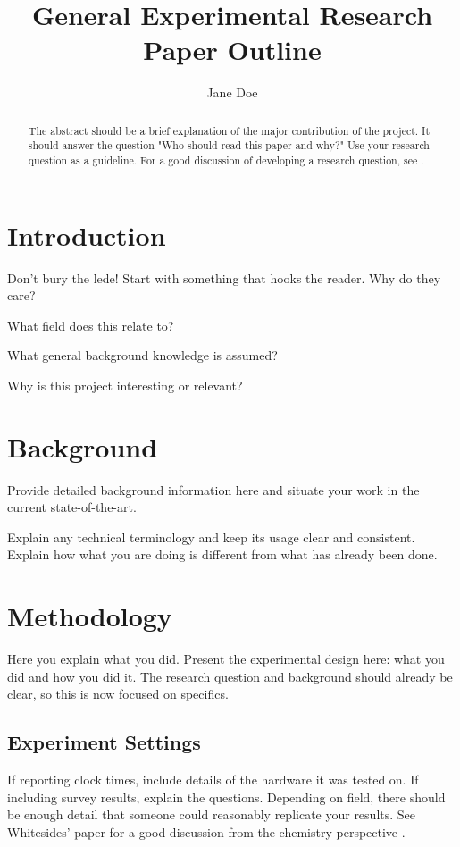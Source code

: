 \documentclass[12pt]{article} %
\author{Jane Doe}
\title{General Experimental Research Paper Outline}
\begin{document}
\maketitle

\begin{abstract}
The abstract should be a brief explanation of the major contribution of the project. It should answer the question "Who should read this paper and why?" Use your research question as a guideline. For a good discussion of developing a research question, see \cite{Wright1999}.
\end{abstract}

\section{Introduction}
\label{sec:intro}
Don't bury the lede! Start with something that hooks the reader. Why do they care?

\begin{compactlist}
\item What field does this relate to?
\item What general background knowledge is assumed?
\item Why is this project interesting or relevant?
\end{compactlist}

\section{Background}
\label{sec:background}
Provide detailed background information here and situate your work in the current state-of-the-art.

Explain any technical terminology and keep its usage clear and consistent.
Explain how what you are doing is different from what has already been done.

\section{Methodology}
\label{sec:methods}
Here you explain what you did. Present the experimental design here: what you did and how you did it. The research question and background should already be clear, so this is now focused on specifics.

\subsection{Experiment Settings}
\label{sec:exp}
If reporting clock times, include details of the hardware it was tested on. If including survey results, explain the questions. Depending on field, there should be enough detail that someone could reasonably replicate your results. See Whitesides' paper for a good discussion from the chemistry perspective \cite{Whitesides2004}.
\end{document}
